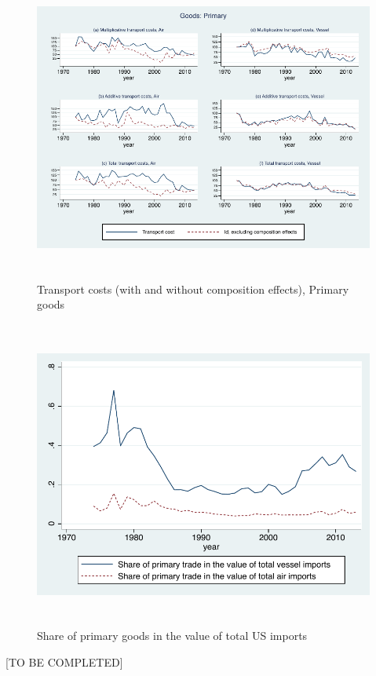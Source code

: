 \documentclass[11pt,twoside, authoryear]{elsarticle}
\begin{document}
\begin{figure}[htbp]
\caption{Transport costs (with and without composition effects), Primary goods}
\label{fig:totalTC_compeffects_excl_primary}
\begin{center}
\includegraphics[height=4in]
{graph_composition_primary.pdf}
\end{center}
\end{figure}



\begin{figure}[htbp]
\caption{Share of primary goods in the value of total US imports}
\label{fig:Share_prim_goods}
\begin{center}
\includegraphics[height=4in]
{Share_of_primary.pdf}
\end{center}
\end{figure}




[TO BE COMPLETED]
\end{document}
